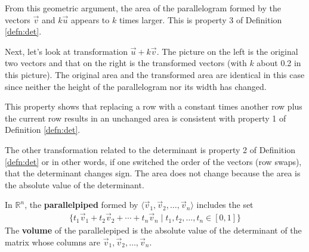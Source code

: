 From this geometric argument, the area of the parallelogram formed by the vectors $\vec{v}$ and $k\vec{u}$ appears to $k$ times larger.  This is property 3 of Definition \ref{defn:det}.  


Next, let's look at transformation $\vec{u} + k\vec{v}$.  The picture on the left is the original two vectors and that on the right is the transformed vectors (with $k$ about 0.2 in this picture).  The original area and the transformed area are identical in this case since neither the height of the parallelogram nor its width has changed.  

\begin{center}
\end{center}

This property shows that replacing a row with a constant times another row plus the current row results in an unchanged area is consistent with property 1 of Definition \ref{defn:det}.  


The other transformation related to the determinant is property 2 of Definition \ref{defn:det} or in other words,  if one switched the order of the vectors (row swaps), that the determinant changes sign.  The area does not change because the area is the absolute value of the determinant.  



\begin{definition}
In $\mathbb{R}^n$, the \textbf{parallelpiped} formed by $\langle \vec{v}_1, \vec{v}_2, \ldots, \vec{v}_n \rangle$ includes the set
%
\begin{align*}
\{ t_1 \vec{v}_1 + t_2 \vec{v}_2 + \cdots + t_n \vec{v}_n\; | \; t_1, t_2, \ldots, t_n \in [0,1] \}
\end{align*}
The \textbf{volume} of the parallelepiped is the absolute value of the determinant of the matrix whose columns are $\vec{v}_1, \vec{v}_2, \ldots, \vec{v}_n$.  
\end{definition}

